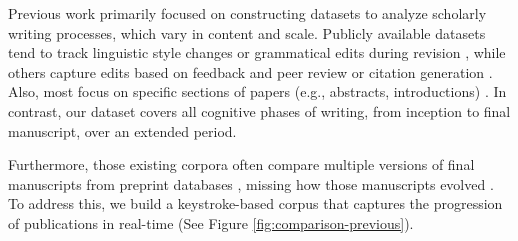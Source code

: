 Previous work primarily focused on constructing datasets to analyze scholarly writing processes, which vary in content and scale. Publicly available datasets tend to track linguistic style changes or grammatical edits during revision \cite{du-etal-2022-understanding-iterative, jiang-etal-2022-arxivedits, ito2019diamonds, mita2022towards}, while others capture edits based on feedback and peer review \cite{darcy-etal-2024-aries, jourdan2024casimir, kuznetsov2022revise} or citation generation \cite{kobayashi-etal-2022-dataset, narimatsu2021task}. Also, most focus on specific sections of papers (e.g., abstracts, introductions) \cite{du-etal-2022-understanding-iterative, mita2022towards}. In contrast, our dataset covers all cognitive phases of writing, from inception to final manuscript, over an extended period.

Furthermore, those existing corpora often compare multiple versions of final manuscripts from preprint databases \cite{jiang-etal-2022-arxivedits, du-etal-2022-understanding-iterative, darcy-etal-2024-aries, jourdan2024casimir}, missing how those manuscripts evolved \cite{jourdan2023text}. To address this, we build a keystroke-based corpus that captures the progression of publications in real-time (See Figure \ref{fig:comparison-previous}).




